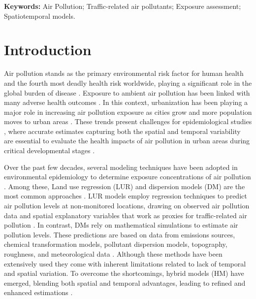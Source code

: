 \documentclass{article}
\begin{document}
\begin{abstract}
\end{abstract}

\textbf{Keywords:} Air Pollution; Traffic-related air pollutants; Exposure assessment; Spatiotemporal models.


\newpage
\section{Introduction}

Air pollution stands as the primary environmental risk factor for human health and the fourth most deadly health risk worldwide, playing a significant role in the global burden of disease \cite{cohen2017, he2020state}. Exposure to ambient air pollution has been linked with many adverse health outcomes \cite{boogaard2022, guxens2022hei, haddad2023}. In this context, urbanization has been playing a major role in increasing air pollution exposure as cities grow and more population moves to urban areas \cite{nieuwenhuijsen2016}. These trends present challenges for epidemiological studies \cite{tonne2017}, where accurate estimates capturing both the spatial and temporal variability are essential to evaluate the health impacts of air pollution in urban areas during critical developmental stages \cite{boogaard2022}. 

Over the past few decades, several modeling techniques have been adopted in environmental epidemiology to determine exposure concentrations of air pollution \cite{hoek2017, di2019no2, di2019pm25, stafoggia2019, stafoggia2020}. Among these, Land use regression (LUR) and dispersion models (DM) are the most common approaches \cite{gulliver2015, dehoogh2014}. LUR models employ regression techniques to predict air pollution levels at non-monitored locations, drawing on observed air pollution data and spatial explanatory variables that work as proxies for traffic-related air pollution \cite{briggs1997, hoek2008}. In contrast, DMs rely on mathematical simulations to estimate air pollution levels. These predictions are based on data from emissions sources, chemical transformation models, pollutant dispersion models, topography, roughness, and meteorological data \cite{hoek2017}. Although these methods have been extensively used they come with inherent limitations related to lack of temporal and spatial variation. To overcome the shortcomings, hybrid models (HM) have emerged, blending both spatial and temporal advantages, leading to refined and enhanced estimations \cite{hoek2017, korek2017, tularam2021, oh2021}. 
\end{document}
